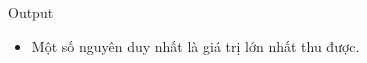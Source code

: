 Output
\begin{itemize}
	\item     Một số nguyên duy nhất là giá trị lớn nhất thu được.   
\end{itemize}